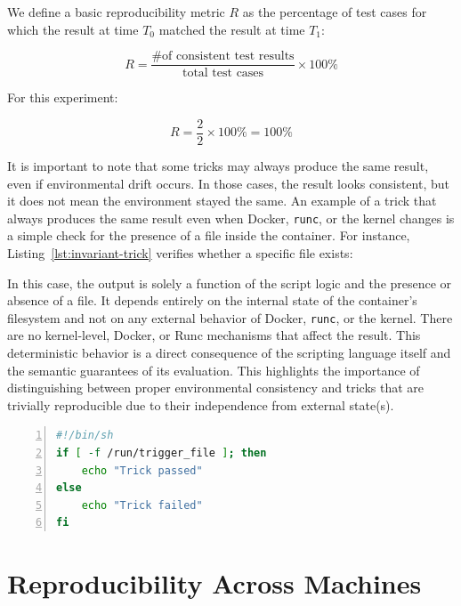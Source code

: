 \documentclass[12pt]{report}
\begin{document}
\begin{doublespace}
We define a basic reproducibility metric \( R \) as the percentage of test cases for which the result at time \( T_0 \) matched the result at time \( T_1 \):

\[
R = \frac{\text{\# of consistent test results}}{\text{total test cases}} \times 100\%
\]

For this experiment:

\[
R = \frac{2}{2} \times 100\% = 100\%
\]

It is important to note that some tricks may always produce the same result, even if environmental drift occurs. In those cases, the result looks consistent, but it does not mean the environment stayed the same. An example of a trick that always produces the same result even when Docker, \texttt{runc}, or the kernel changes is a simple check for the presence of a file inside the container. For instance, Listing~\ref{lst:invariant-trick} verifies whether a specific file exists:

In this case, the output is solely a function of the script logic and the presence or absence of a file. It depends entirely on the internal state of the container's filesystem and not on any external behavior of Docker, \texttt{runc}, or the kernel. There are no kernel-level, Docker, or Runc mechanisms that affect the result. This deterministic behavior is a direct consequence of the scripting language itself and the semantic guarantees of its evaluation. This highlights the importance of distinguishing between proper environmental consistency and tricks that are trivially reproducible due to their independence from external state(s).

\begin{lstlisting}[language=bash, caption={Trick that is invariant to environment changes}, label={lst:invariant-trick}, numbers=left, numberstyle=\tiny, stepnumber=1, frame=single, backgroundcolor=\color{gray!10}, basicstyle=\ttfamily\footnotesize,  showspaces=false, showstringspaces=false]
#!/bin/sh
if [ -f /run/trigger_file ]; then
    echo "Trick passed"
else
    echo "Trick failed"
fi
\end{lstlisting}



















\section{Reproducibility Across Machines}


\end{doublespace}
\end{document}
